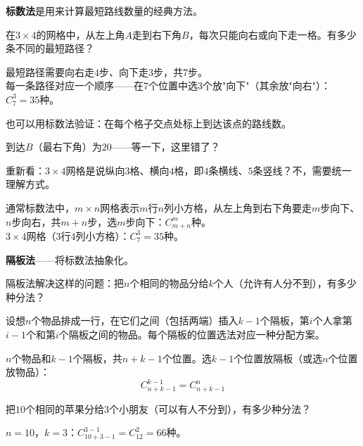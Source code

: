 
\textbf{标数法}是用来计算最短路线数量的经典方法。

\begin{example}
在$3\times4$的网格中，从左上角$A$走到右下角$B$，每次只能向右或向下走一格。有多少条不同的最短路径？
\end{example}
\begin{solution}
最短路径需要向右走$4$步、向下走$3$步，共$7$步。\\
每一条路径对应一个顺序——在$7$个位置中选$3$个放"向下"（其余放"向右"）：$C_7^3 = 35$种。

也可以用标数法验证：在每个格子交点处标上到达该点的路线数。
\begin{center}
\end{center}
到达$B$（最右下角）为$20$——等一下，这里错了？

重新看：$3\times4$网格是说纵向$3$格、横向$4$格，即$4$条横线、$5$条竖线？不，需要统一理解方式。

通常标数法中，$m\times n$网格表示$m$行$n$列小方格，从左上角到右下角要走$m$步向下、$n$步向右，共$m+n$步，选$m$步向下：$C_{m+n}^m$种。\\
$3\times4$网格（$3$行$4$列小方格）：$C_7^3 = 35$种。
\end{solution}

\textbf{隔板法}——将标数法抽象化。

隔板法解决这样的问题：把$n$个相同的物品分给$k$个人（允许有人分不到），有多少种分法？

设想$n$个物品排成一行，在它们之间（包括两端）插入$k-1$个隔板，第$i$个人拿第$i-1$个和第$i$个隔板之间的物品。每个隔板的位置选法对应一种分配方案。

$n$个物品和$k-1$个隔板，共$n+k-1$个位置。选$k-1$个位置放隔板（或选$n$个位置放物品）：
\[
C_{n+k-1}^{k-1} = C_{n+k-1}^{n}
\]

\begin{example}
把$10$个相同的苹果分给$3$个小朋友（可以有人不分到），有多少种分法？
\end{example}
\begin{solution}
$n=10$，$k=3$：$C_{10+3-1}^{3-1} = C_{12}^2 = 66$种。
\end{solution}

